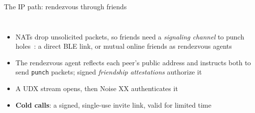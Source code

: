 \begin{frame}{The IP path: rendezvous through friends}
\begin{columns}[T]
{
    }
    \raggeditems
    \begin{itemize}
        \item NATs drop unsolicited packets, so friends need a \emph{signaling channel} to punch holes~\cite{RFC5128}: a direct BLE link, or mutual online friends as rendezvous agents
        \item The rendezvous agent reflects each peer's public address and instructs both to send \texttt{punch} packets; signed \emph{friendship attestations} authorize it
        \item A UDX stream opens, then Noise XX authenticates it
        \item \textbf{Cold calls}: a signed, single-use invite link, valid for limited time
    \end{itemize}
    \end{columns}
\end{frame}
